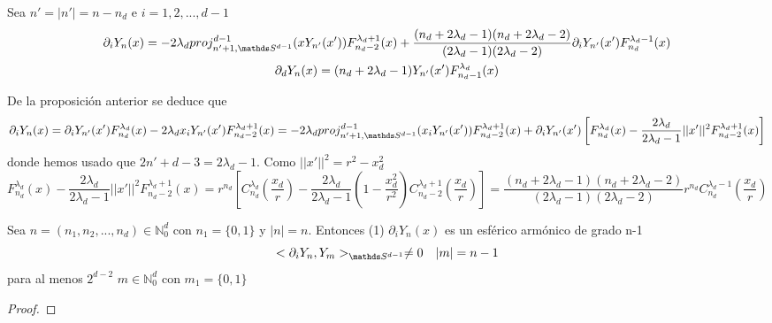 \begin{prop}Sea $n'=|n'|=n-n_d$ e $i=1,2,...,d-1$
	\begin{gather*}
	\partial_i Y_n(x) = -2\lambda_d proj_{n'+1,\sphere}^{d-1}(xY_{n'}(x'))F_{n_d-2}^{\lambda_d+1}(x)+\frac{(n_d+2\lambda_d-1)(n_d+2\lambda_d-2)}{(2\lambda_d-1)(2\lambda_d-2)}\partial_iY_{n'}(x')F_{n_d}^{\lambda_d-1}(x) \\
	\partial_dY_n(x) = (n_d+2\lambda_d-1)Y_{n'}(x')F_{n_d-1}^{\lambda_d}(x)
	\end{gather*}
\end{prop}
\begin{prop}
	De la proposición anterior se deduce que
	$$ \partial_i Y_n(x) = \partial_i Y_{n'}(x')F_{n_d}^{\lambda_d}(x) - 2 \lambda_dx_iY_{n'}(x')F_ {n_d-2}^{\lambda_d+1}(x) = -2\lambda_dproj_{n'+1,\sphere}^{d-1}(x_i Y_{n'}(x'))F_{n_d-2}^{\lambda_d+1}(x) + \partial_iY_{n'}(x')\left[F_{n_d}^{\lambda_d}(x)-\frac{2\lambda_d}{2\lambda_d-1}||x'||^2F_{n_d-2}^{\lambda_d+1}(x)\right]$$
	donde hemos usado que $2n'+d-3=2\lambda_d-1$. Como $||x'||^2=r^2-x_d^2$
	$$
	F_{n_d}^{\lambda_d}(x)-\frac{2\lambda_d}{2\lambda_d-1}||x'||^2F_{n_d-2}^{\lambda_d+1}(x) = r^{n_d}\left[C_{n_d}^{\lambda_d}(\frac{x_d}{r})-\frac{2\lambda_d}{2\lambda_d-1}(1-\frac{x_d^2}{r^2})C_{n_d-2}^{\lambda_d+1}(\frac{x_d}{r})\right] = \frac{(n_d+2\lambda_d-1)(n_d+2\lambda_d-2)}{(2\lambda_d-1)(2\lambda_d-2)}r^{n_d}C_{n_d}^{\lambda_d-1}(\frac{x_d}{r})
	$$
\end{prop}
\begin{thm}
	Sea $n=(n_1,n_2,...,n_d)\in\mathds{N}_0^d$ con $n_1=\{0,1\}$ y $|n|=n$. Entonces
	(1) $\partial_i Y_n(x)$ es un esférico armónico de grado n-1 $$
	<\partial_i Y_n,Y_m>_{\sphere} \neq 0 \quad |m|=n-1$$
	para al menos $2^{d-2}$ $m\in\mathds{N}_0^d$ con $m_1=\{0,1\}$
\end{thm}
\begin{proof}
	
\end{proof}
